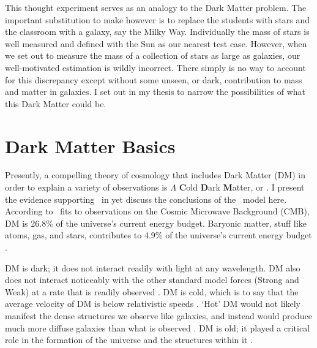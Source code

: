 This thought experiment serves as an analogy to the Dark Matter problem.
The important substitution to make however is to replace the students with stars and the classroom with a galaxy, say the Milky Way.
Individually the mass of stars is well measured and defined with the Sun as our nearest test case.
However, when we set out to measure the mass of a collection of stars as large as galaxies, our well-motivated estimation is wildly incorrect.
There simply is no way to account for this discrepancy except without some unseen, or dark, contribution to mass and matter in galaxies.
I set out in my thesis to narrow the possibilities of what this Dark Matter could be.

\section{Dark Matter Basics\label{sec:basicDM}}

Presently, a compelling theory of cosmology that includes Dark Matter (DM) in order to explain a variety of observations is $\Lambda$ \textbf{C}old \textbf{D}ark \textbf{M}atter, or \lcdm.
I present the evidence supporting \lcdm~in  yet discuss the conclusions of the \lcdm~model here.
According to \lcdm~fits to observations on the Cosmic Microwave Background (CMB), DM is 26.8\% of the universe's current energy budget.
Baryonic matter, stuff like atoms, gas, and stars, contributes to 4.9\% of the universe's current energy budget \cite{Greene:cosmology_dm,Young:cosmology_dm,Bertone:particleDM}.


DM is dark; it does not interact readily with light at any wavelength.
DM also does not interact noticeably with the other standard model forces (Strong and Weak) at a rate that is readily observed \cite{Bertone:particleDM}.
DM is cold, which is to say that the average velocity of DM is below relativistic speeds \cite{Greene:cosmology_dm}.
`Hot' DM would not likely manifest the dense structures we observe like galaxies, and instead would produce much more diffuse galaxies than what is observed \cite{Bertone:particleDM,Greene:cosmology_dm}.
DM is old; it played a critical role in the formation of the universe and the structures within it \cite{Greene:cosmology_dm,Young:cosmology_dm}.

